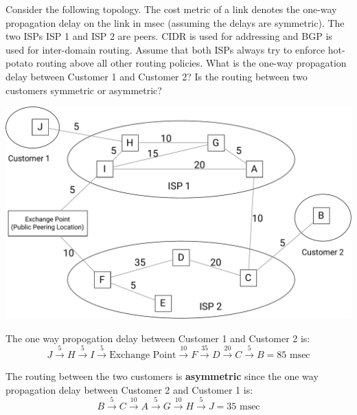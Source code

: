 \documentclass{report}
\begin{document}
\newpage
\begin{problem}

Consider the following topology.
The cost metric of a link denotes the one-way propagation delay on the link in msec (assuming the delays are symmetric).
The two ISPs ISP 1 and ISP 2 are peers.
CIDR is used for addressing and BGP is used for inter-domain routing.
Assume that both ISPs always try to enforce hot-potato routing above all other routing policies.
What is the one-way propagation delay between Customer 1 and Customer 2?
Is the routing between two customers symmetric or asymmetric?

\begin{center}
\includegraphics[width=.75\columnwidth]{figures/hw7-3.pdf}
\end{center}

\medskip

\begin{answer}{30em}
    The one way propogation delay between Customer 1 and Customer 2 is:
    \[
        J \overset{5}{\to} H \overset{5}{\to} I \overset{5}{\to} \text{Exchange Point} 
        \overset{10}{\to} F \overset{35}{\to} D \overset{20}{\to} C \overset{5}{\to} B = 85\text{ msec}
    \]

    The routing between the two customers is \textbf{asymmetric} since the one way propagation delay between 
    Customer 2 and Customer 1 is:
    \[
        B \overset{5}{\to} C \overset{10}{\to} A \overset{5}{\to} G 
        \overset{10}{\to} H \overset{5}{\to} J = 35\text{ msec} 
    \]
\end{answer}

\end{problem}
\end{document}
